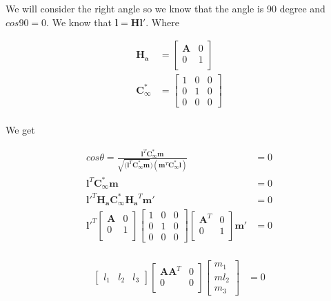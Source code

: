 \documentclass[11pt]{article}
\begin{document}
We will consider the right angle so we know that the angle is 90 degree and $cos 90 = 0$. We know that $\mathbf{l} = \mathbf{H} \mathbf{l}'$. Where 

\begin{align*}
\mathbf{H_a} &= 
\begin{bmatrix}
\mathbf{A} & 0 \\
0 & 1  \\
\end{bmatrix} \\
\mathbf{C_{\infty}^*} &= 
\begin{bmatrix}
1 & 0 & 0\\
0 & 1 & 0 \\
0 & 0 & 0
\end{bmatrix} \\
\end{align*}

We get

\begin{align*}
 cos \theta = \frac{\mathbf{l}^T \mathbf{C_{\infty}^*}\mathbf{m}}{\sqrt{(\mathbf{l}^T \mathbf{C_{\infty}^*}\mathbf{m}})(\mathbf{m}^T \mathbf{C_{\infty}^*}\mathbf{l})} &= 0 \\
\mathbf{l}^T \mathbf{C_{\infty}^*}\mathbf{m}  &= 0\\
\mathbf{l'}^T\mathbf{H_a} \mathbf{C_{\infty}^*}\mathbf{H_a}^T\mathbf{m'}  &= 0\\
\mathbf{l'}^T
\begin{bmatrix}
\mathbf{A} & 0 \\
0 & 1  \\
\end{bmatrix} 
\begin{bmatrix}
1 & 0 & 0\\
0 & 1 & 0 \\
0 & 0 & 0
\end{bmatrix} 
\begin{bmatrix}
\mathbf{A}^T & 0 \\
0 & 1  \\
\end{bmatrix} 
\mathbf{m'} &= 0\\
\end{align*}


\begin{align*}
\begin{bmatrix}
l_1 & l_2 & l_3
\end{bmatrix}
\begin{bmatrix}
\mathbf{A}\mathbf{A}^T & 0 \\
0 & 0  \\
\end{bmatrix} 
\begin{bmatrix}
m_1 \\ ml_2 \\ m_3
\end{bmatrix}
 &= 0\\
\end{align*}
\end{document}
